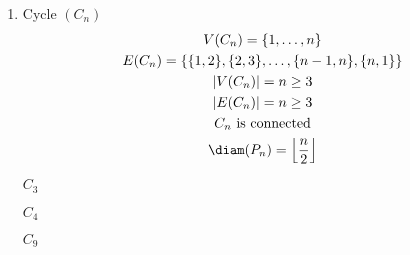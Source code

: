 \documentclass[letterpaper,12pt,fleqn]{article}
\begin{document}
\begin{enumerate}[left=0pt]
  \bigskip

\item Cycle \((C_n)\)
  \begin{gather*}
    V(C_n)=\set{1,\ldots,n} \\
    E(C_n)=\set{\set{1,2},\set{2,3},\ldots,\set{n-1,n},\set{n,1}} \\
    \abs{V(C_n)}=n\ge 3 \\
    \abs{E(C_n)}=n\ge 3 \\
    C_n\ \text{is connected} \\
    \diam(P_n)=\floor*{\frac{n}{2}}
  \end{gather*}

  \begin{examples}
    \begin{minipage}{2in}
      \begin{center}

        \bigskip

        \(C_3\)
      \end{center}
    \end{minipage}
    \begin{minipage}{2in}
      \begin{center}

        \bigskip

        \(C_4\)
      \end{center}
    \end{minipage}
    \begin{minipage}{2in}
      \begin{center}

        \bigskip

        \(C_9\)
      \end{center}
    \end{minipage}
  \end{examples}

  \bigskip


\end{enumerate}
\end{document}
